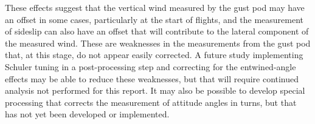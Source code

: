 \documentclass[12pt,twoside,english]{article}\usepackage[]{graphicx}\usepackage[]{color}
\begin{document}
{{These effects suggest that the vertical wind measured by the gust pod may have an offset in some cases, particularly at the start of flights, and the measurement of sideslip can also have an offset that will contribute to the lateral component of the measured wind. These are weaknesses in the measurements from the gust pod that, at this stage, do not appear easily corrected. A future study implementing Schuler tuning in a post-processing step and correcting for the entwined-angle effects may be able to reduce these weaknesses, but that will require continued analysis not performed for this report. It may also be possible to develop special processing that corrects the measurement of attitude angles in turns, but that has not yet been developed or implemented. 
% 

}}
\end{document}
